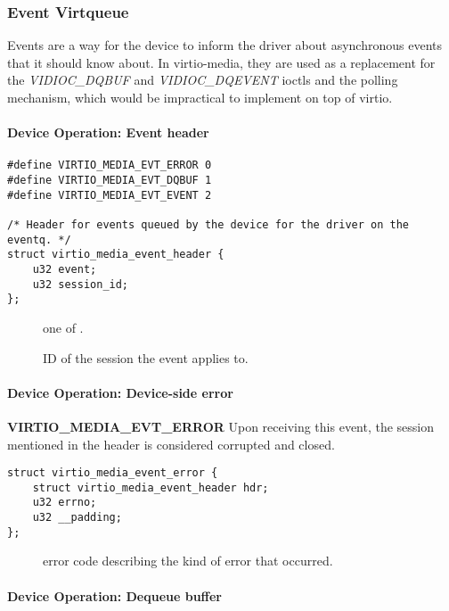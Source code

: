 \subsubsection{Event Virtqueue}

Events are a way for the device to inform the driver about asynchronous events
that it should know about. In virtio-media, they are used as a replacement for
the \textit{VIDIOC_DQBUF} and \textit{VIDIOC_DQEVENT} ioctls and the polling
mechanism, which would be impractical to implement on top of virtio.

\paragraph{Device Operation: Event header}

\begin{lstlisting}
#define VIRTIO_MEDIA_EVT_ERROR 0
#define VIRTIO_MEDIA_EVT_DQBUF 1
#define VIRTIO_MEDIA_EVT_EVENT 2

/* Header for events queued by the device for the driver on the eventq. */
struct virtio_media_event_header {
    u32 event;
    u32 session_id;
};
\end{lstlisting}

\begin{description}
\item[] one of .
\item[] ID of the session the event applies to.
\end{description}

\paragraph{Device Operation: Device-side error}

\textbf{VIRTIO_MEDIA_EVT_ERROR} Upon receiving this event, the session
mentioned in the header is considered corrupted and closed.

\begin{lstlisting}
struct virtio_media_event_error {
    struct virtio_media_event_header hdr;
    u32 errno;
    u32 __padding;
};
\end{lstlisting}

\begin{description}
\item[] error code describing the kind of error that occurred.
\end{description}

\paragraph{Device Operation: Dequeue buffer}
\label{sec:Device Types / Media Device / Device Operation / Dequeue buffer}

